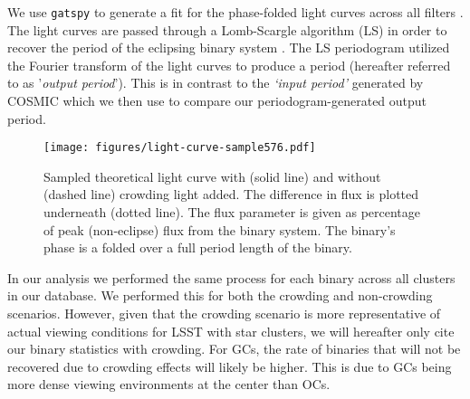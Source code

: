 \documentclass[twocolumn]{aastex63}
\begin{document}
 We use \texttt{gatspy} to generate a fit for the phase-folded light curves across all filters \citep{2016ascl.soft10007V}. The light curves are passed through a Lomb-Scargle algorithm (LS) in order to recover the period of the eclipsing binary system \citep{2015ApJ...812...18V}. The LS periodogram utilized the Fourier transform of the light curves to produce a period (hereafter referred to as '\textit{output period}'). This is in contrast to the \textit{‘input period’} generated by COSMIC which we then use to compare our periodogram-generated output period. 

\begin{figure}
    \centering
    \texttt{[image: figures/light-curve-sample576.pdf]}
    \caption{Sampled theoretical light curve with (solid line) and without (dashed line) crowding light added. The difference in flux is plotted underneath (dotted line). The flux parameter is given as percentage of peak (non-eclipse) flux from the binary system. The binary's phase is a folded over a full period length of the binary.}
    \label{fig:light3curve}
\end{figure}

In our analysis we performed the same process for each binary across all clusters in our database. We performed this for both the crowding and non-crowding scenarios. However, given that the crowding scenario is more representative of actual viewing conditions for LSST with star clusters, we will hereafter only cite our binary statistics with crowding. For GCs, the rate of binaries that will not be recovered due to crowding effects will likely be higher. This is due to GCs being more dense viewing environments at the center than OCs.


\end{document}
